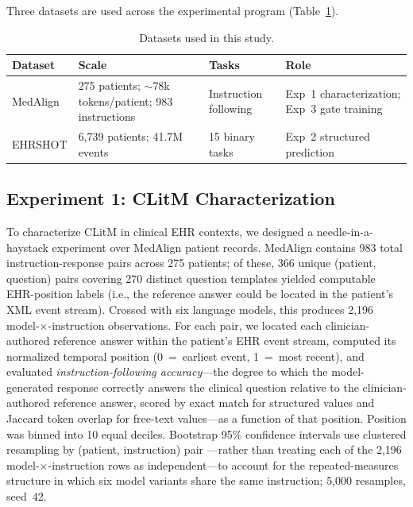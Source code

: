 \documentclass{article}
\begin{document}
Three datasets are used across the experimental program (Table~\ref{tab:datasets}).

\begin{table}[h]
\centering
\caption{Datasets used in this study.}
\label{tab:datasets}
\small
\begin{tabular}{@{}p{2.5cm}p{4.2cm}p{2.5cm}p{2.8cm}@{}}
\toprule
Dataset & Scale & Tasks & Role \\
\midrule
MedAlign \cite{fleming2024medalign}
  & 275 patients; $\sim$78k tokens/patient; 983 instructions
  & Instruction following
  & Exp~1 characterization; Exp~3 gate training \\[2pt]
EHRSHOT \cite{wornow2023ehrshot}
  & 6,739 patients; 41.7M events
  & 15 binary tasks
  & Exp~2 structured prediction \\
\bottomrule
\end{tabular}
\end{table}

\subsection{Experiment 1: CLitM Characterization}
\label{sec:exp1}

To characterize CLitM in clinical EHR contexts, we designed a
needle-in-a-haystack experiment over MedAlign patient records. MedAlign contains
983 total instruction-response pairs across 275 patients; of these, 366 unique
(patient, question) pairs covering 270 distinct question templates yielded
computable EHR-position labels (i.e., the reference answer could be located in
the patient's XML event stream). Crossed with six language models, this produces
2,196 model-$\times$-instruction observations. For each pair, we located each
clinician-authored reference answer within the patient's EHR event stream,
computed its normalized temporal position (0~=~earliest event, 1~=~most
recent), and evaluated \emph{instruction-following accuracy}---the degree to
which the model-generated response correctly answers the clinical question
relative to the clinician-authored reference answer, scored by exact match for
structured values and Jaccard token overlap for free-text values---as a function
of that position. Position was binned into 10 equal deciles. Bootstrap 95\%
confidence intervals use clustered resampling by (patient, instruction) pair
---rather than treating each of the 2,196 model-$\times$-instruction rows as
independent---to account for the repeated-measures structure in which six model
variants share the same instruction; 5,000 resamples, seed~42.
\end{document}
